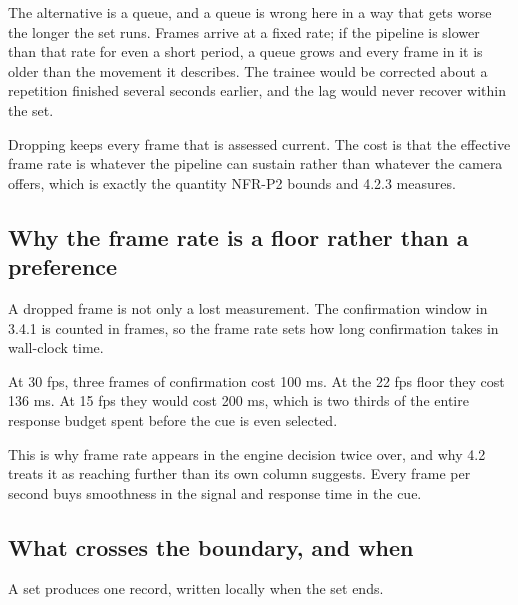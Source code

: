 The alternative is a queue, and a queue is wrong here in a way that gets worse the longer the set runs. Frames arrive at a fixed rate; if the pipeline is slower than that rate for even a short period, a queue grows and every frame in it is older than the movement it describes. The trainee would be corrected about a repetition finished several seconds earlier, and the lag would never recover within the set.

Dropping keeps every frame that is assessed current. The cost is that the effective frame rate is whatever the pipeline can sustain rather than whatever the camera offers, which is exactly the quantity NFR-P2 bounds and 4.2.3 measures.

\subsection{Why the frame rate is a floor rather than a preference}
\label{sec:5.5.3}

A dropped frame is not only a lost measurement. The confirmation window in 3.4.1 is counted in frames, so the frame rate sets how long confirmation takes in wall-clock time.

At 30 fps, three frames of confirmation cost 100 ms. At the 22 fps floor they cost 136 ms. At 15 fps they would cost 200 ms, which is two thirds of the entire response budget spent before the cue is even selected.

This is why frame rate appears in the engine decision twice over, and why 4.2 treats it as reaching further than its own column suggests. Every frame per second buys smoothness in the signal and response time in the cue.

\subsection{What crosses the boundary, and when}
\label{sec:5.5.4}

A set produces one record, written locally when the set ends.

